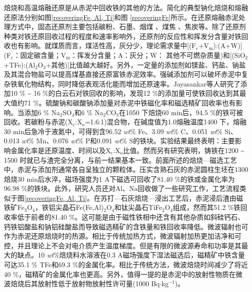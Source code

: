 焙烧和高温熔融还原是从赤泥中回收铁的其他的方法\cite{kumar1998utilization}。简化的典型钠化焙烧和熔融还原法分别如图\ref{recoveringFe, Al, Ti}\cite{kumar1998utilization}和图 \ref{recoveringFe}\cite{zhu2012recovery}所示。在还原熔融赤泥处理方式中，固态还原剂主要包括碳粉\cite{liu2009application,li2009recovery,raspopov2013reduction}、石墨\cite{jayasankar2012production}、烟煤\cite{liu2012experimental} 、煤焦\cite{zhu2012recovery} 、焦炭\cite{rath2013statistical}等。除了还原剂种类对铁还原回收过程的程度和速率影响外，还原剂的反应性和挥发分含量对铁回收也有影响\cite{xiangong1996kinetics}。就煤质而言，煤活性高，灰分少，理论需求量中[(F$ \mathrm{_{c}} $+V$ \mathrm{_{m}} $):(A+W)] (F$ \mathrm{_{c}} $：固定碳含量；V$ \mathrm{_{m}} $：挥发分含量；A：灰分；W： 其他不可燃杂质量)和[(SiO$ _{\mathrm{2}} $+TFe):(Al$ _{\mathrm{2}} $O$ _{\mathrm{3}} $+其他)]比值越大越好\cite{yongkang1995study}。另外，一定量的添加剂如镁盐、钙盐、钠盐及其混合物盐可以提高煤基直接还原富铁赤泥效率。强碱添加剂可以破坏赤泥中复杂铁氧化物结构，同时降低表观活化能而增加还原速率\cite{qiu1996influence}。Jayasankar\cite{jayasankar2012production}等人研究了添加10 \% \textasciitilde{ }16 \%的白云石对铁回收的影响，发现12 \%的添加量可使铁回收达到其最大值约71 \%。硫酸钠和碳酸钠添加量对赤泥中铁磁化率和磁选精矿回收率也有影响。当添加6 \% Na$ _{\mathrm{2}} $SO$ _{\mathrm{4}} $和6 \% Na$ _{\mathrm{2}} $CO$ _{\mathrm{3}} $在1050 \textcelsius 下焙烧60 min后，94.5 \%的铁可被回收\cite{rao2013iron}。若碳粉与赤泥(X$ \mathrm{_{c}} $:X$ \mathrm{_{o}} $=1.6:1)混合物，在碱度值为1.0熔融温度1400 \textcelsius 下，熔融30 min后急冷于液氮中，可得到含96.52 \textit{wt}\% Fe、3.09 \textit{wt}\% C、0.051 \textit{wt}\% Si、0.013 \textit{wt}\% Mn、0.076 \textit{wt}\% P和0.091 \textit{wt}\% S的铁块\cite{guo2013nuggets}。实验结果最终表明：主要影响金属化率是还原温度、时间以及X$ \mathrm{_{c}} $:X$ \mathrm{_{o}} $比值。然而另有研究表明，铸铁在1200 \textasciitilde{ }1500 \textcelsius 时就已与渣完全分离\cite{raspopov2013reduction}，与前一结果基本一致。前面所述的焙烧—磁选工艺中，赤泥与添加剂通常各自呈独立的颗粒体。压实含熟石灰的赤泥圆柱生坯在1300 \textcelsius 焙烧30 min后水淬，磁场强度为1 A下磁选可回收了81.40 \%的铁或金属化率为96.98 \%的铁块\cite{liu2009application}。此外，研究人员还对Al、Na回收做了一些研究工作\cite{liu2012experimental}，工艺流程类似于图\ref{recoveringFe, Al, Ti}。在苏打—石灰焙烧—浸出工艺后，赤泥浸后渣由磁铁矿Fe$ _{\mathrm{3}} $O$ _{\mathrm{4}} $，铁铝尖晶石Fe(Fe,Al)$ _{\mathrm{2}} $O$ _{\mathrm{4}} $和钛尖晶石TiFe$ _{\mathrm{2}} $O$ _{\mathrm{4}} $组成，然而其51.2 \%铁回收率低于前者的81.40 \%。这可能是由于磁性铁相中还含有其他杂质如斜硅钙石、钙铁铝酸盐和钠铝硅酸盐而导致磁选精矿的含铁量和铁回收率降低。微波辐射也可作为赤泥还原焙烧时的热源\cite{samouhos2013greek}。相比于传统加热方式，微波辐射加热更加洁净和可控，并且理论上不会对电介质产生温度梯度。但是有限的微波源寿命和功率是其最大的缺点。10 \textit{wt}\%焙烧料水溶液在0.3 A磁场强度下湿法磁选后，磁精矿中铁含量可达35.1 \% TFe和69.3 \%的金属化率。相比于传统方法，微波焙烧时间减少了将近40 \%，磁精矿的金属化率也更高。另外，值得一提的是赤泥中的放射性物质在微波焙烧后其放射性低于放射物放射性许可量(1000 Bq$ \cdot $kg$ ^{\mathrm{-1}} $)\cite{samouhos2013greek}。

